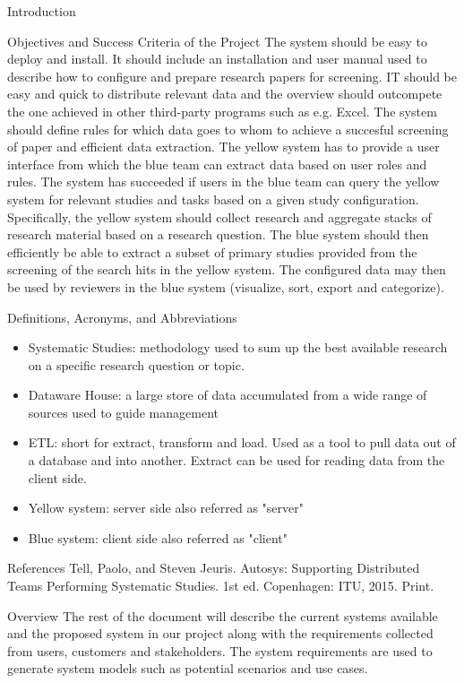 \documentclass{article}
\begin{document}
\begin{section}{Introduction}
\begin{subsection}{Objectives and Success Criteria of the Project}
The system should be easy to deploy and install. It should include an installation and user manual used to describe how to configure and prepare research papers for screening. IT should be easy and quick to distribute relevant data and the overview should outcompete the one achieved in other third-party programs such as e.g. Excel. The system should define rules for which data goes to whom to achieve a succesful screening of paper and efficient data extraction. The yellow system has to provide a user interface from which the blue team can extract data based on user roles and rules. The system has succeeded if users in the blue team can query the yellow system for relevant studies and tasks based on a given study configuration. Specifically, the yellow system should collect research and aggregate stacks of research material based on a research question. The blue system should then efficiently be able to extract a subset of primary studies provided from the screening of the search hits in the yellow system. The configured data may then be used by reviewers in the blue system (visualize, sort, export and categorize).

\end{subsection}


\begin{subsection}{Definitions, Acronyms, and Abbreviations}
	\begin{itemize}
	  \item Systematic Studies: methodology used to sum up the best available research on a specific research question or topic.  
	  \item Dataware House: a large store of data accumulated from a wide range of sources used to guide management 
	  \item ETL: short for extract, transform and load. Used as a tool to pull data out of a database and into another. Extract can be used for reading data from the client side. 
	  \item Yellow system: server side also referred as "server"
	\item Blue system: client side also referred as "client" 
	\end{itemize}

\end{subsection}

\begin{subsection}{References}
Tell, Paolo, and Steven Jeuris. Autosys: Supporting Distributed Teams Performing Systematic Studies. 1st ed. Copenhagen: ITU, 2015. Print.
\end{subsection}

\begin{subsection}{Overview}
The rest of the document will describe the current systems available and the proposed system in our project along with the requirements collected from users, customers and stakeholders. The system requirements are used to generate system models such as potential scenarios and use cases. 
\end{subsection}

\end{section}
\end{document}

